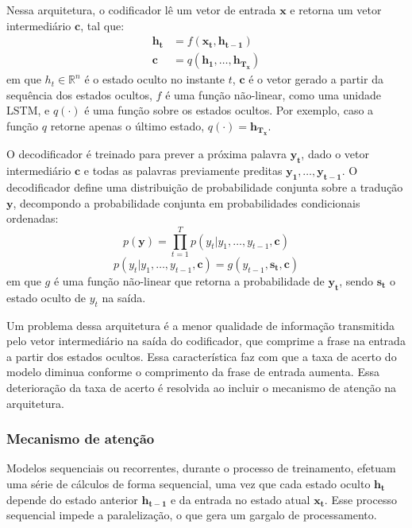 Nessa arquitetura, o codificador lê um vetor de entrada $\mathbf{x}$ e retorna
um vetor intermediário $\mathbf{c}$, tal que:   
\begin{align}
    \mathbf{h_t} &= f(\mathbf{x_t}, \mathbf{h_{t-1}}) \\
    \mathbf{c} &= q(\mathbf{h_1}, \ldots, \mathbf{h_{T_x}})
\end{align}
em que $h_t \in \mathbb{R}^n$ é o estado oculto no instante $t$, $\mathbf{c}$ é o vetor
gerado a partir da sequência dos estados ocultos, $f$ é uma função não-linear,
como uma unidade LSTM, e $q(\cdot)$ é uma função sobre os estados ocultos. Por
exemplo, caso a função $q$ retorne apenas o último estado, $q(\cdot) =
\mathbf{h_{T_x}}$.

O decodificador é treinado para prever a próxima palavra $\mathbf{y_t}$, dado o
vetor intermediário $\mathbf{c}$ e todas as palavras previamente preditas
$\mathbf{y_1}, \ldots, \mathbf{y_{t-1}}$. O decodificador define uma
distribuição de probabilidade conjunta sobre a tradução $\mathbf{y}$, decompondo
a probabilidade conjunta em probabilidades condicionais ordenadas:
\begin{equation}
    p(\mathbf{y}) = \prod_{t=1}^T p(y_t | y_1, \ldots, y_{t-1}, \mathbf{c})
\end{equation}
\begin{equation}
    p(y_t | y_1, \ldots, y_{t-1}, \mathbf{c}) = g(y_{t-1}, \mathbf{s_t}, \mathbf{c})
\end{equation}
em que $g$ é uma função não-linear que retorna a probabilidade de
$\mathbf{y_t}$, sendo $\mathbf{s_t}$ o estado oculto de $y_t$ na saída.

Um problema dessa arquitetura é a menor qualidade de informação transmitida pelo
vetor intermediário na saída do codificador, que comprime a frase na entrada a
partir dos estados ocultos. Essa característica faz com que a taxa de acerto do
modelo diminua conforme o comprimento da frase de entrada aumenta. Essa
deterioração da taxa de acerto é resolvida ao incluir o mecanismo de atenção
na arquitetura.

\subsubsection{Mecanismo de atenção}
Modelos sequenciais ou recorrentes, durante o processo de treinamento, efetuam
uma série de cálculos de forma sequencial, uma vez que cada estado oculto
$\mathbf{h_t}$ depende do estado anterior $\mathbf{h_{t-1}}$ e da entrada no
estado atual $\mathbf{x_t}$. Esse processo sequencial impede a paralelização, o
que gera um gargalo de processamento.

